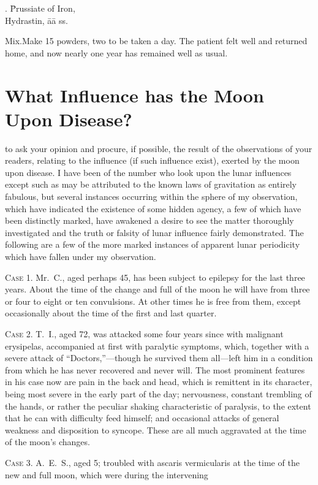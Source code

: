 
\begin{center}
\begin{tabbing}
  \prescription. \= Prussiate of Iron,  \\
    \> Hydrastin, āā \dram{} ss.
\end{tabbing}
\end{center}
Mix.\quad{}Make 15 powders, two to be taken a day. The patient felt
well and returned home, and now nearly one year has remained well as
usual.


\section{What Influence has the Moon Upon Disease?}


 to ask your opinion and procure, if possible, the result of the
observations of your readers, relating to the influence (if such influence
exist), exerted by the moon upon disease. I have been of the number
who look upon the lunar influences except such as may be attributed to
the known laws of gravitation as entirely fabulous, but several instances
occurring within the sphere of my observation, which have indicated
the existence of some hidden agency, a few of which have been distinctly
marked, have awakened a desire to see the matter thoroughly
investigated and the truth or falsity of lunar influence fairly demonstrated.
The following are a few of the more marked instances of apparent lunar
periodicity which have fallen under my observation.

\textsc{Case 1.} Mr.~C., aged perhaps 45, has been subject to epilepsy for
the last three years. About the time of the change and full of the
moon he will have from three or four to eight or ten convulsions. At
other times he is free from them, except occasionally about the time of
the first and last quarter.

\textsc{Case 2.} T.~I., aged 72, was attacked some four years since with malignant
erysipelas, accompanied at first with paralytic symptoms,
which, together with a severe attack of ``Doctors,''---though he survived
them all---left him in a condition from which he has never recovered
and never will. The most prominent features in his case now
are pain in the back and head, which is remittent in its character,
being most severe in the early part of the day; nervousness, constant
trembling of the hands, or rather the peculiar shaking characteristic of
paralysis, to the extent that he can with difficulty feed himself; and
occasional attacks of general weakness and disposition to syncope.
These  are all much aggravated at the time of the moon's
changes.

\textsc{Case 3}. A.~E.~S., aged 5; troubled with ascaris vermicularis at
the time of the new and full moon, which were during the intervening\endinput
